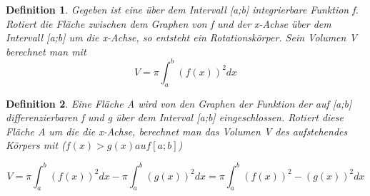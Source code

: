 \documentclass{article}
\newtheorem{definition}{Definition}
\begin{document}
\begin{definition}

Gegeben ist eine über dem Intervall [a;b] integrierbare Funktion f. Rotiert die Fläche zwischen dem Graphen von f und der x-Achse über dem Intervall [a;b] um die x-Achse, so entsteht ein Rotationskörper. Sein Volumen V berechnet man mit \[V = \pi \int_a^b(f(x))^2dx\]

\end{definition}

\begin{definition}

Eine Fläche A wird von den Graphen der Funktion der auf [a;b] differenzierbaren f und g über dem Interval [a;b] eingeschlossen. Rotiert diese Fläche A um die die x-Achse, berechnet man das Volumen V des  aufstehendes Körpers mit ($f(x) > g(x) auf [a;b]$)

\[V = \pi \int_a^b (f(x))^2dx - \pi \int_a^b (g(x))^2dx = \pi \int_a^b (f(x))^2 - (g(x))^2dx\]

\end{definition}
\end{document}
